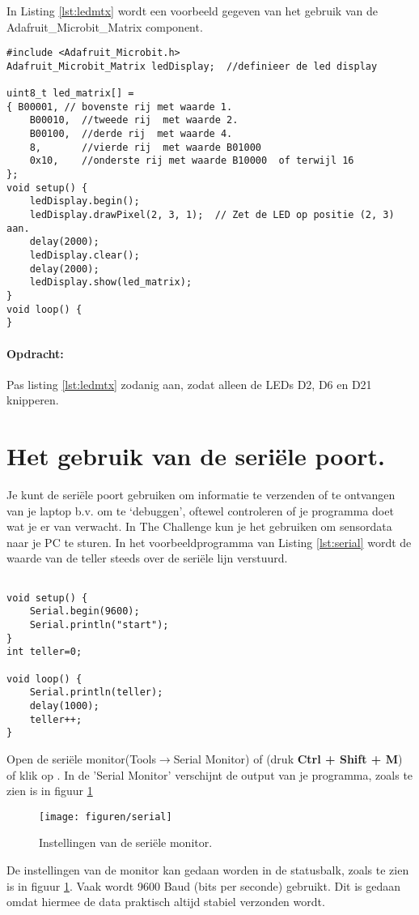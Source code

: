 In Listing \ref{lst:ledmtx} wordt een voorbeeld gegeven van het gebruik van de Adafruit\_Microbit\_Matrix component.

\begin{lstlisting}[caption= Een LED matrix demo,label={lst:ledmtx},firstnumber=1]		
#include <Adafruit_Microbit.h>
Adafruit_Microbit_Matrix ledDisplay;  //definieer de led display

uint8_t led_matrix[] =
{ B00001, // bovenste rij met waarde 1.
	B00010,  //tweede rij  met waarde 2.
	B00100,  //derde rij  met waarde 4.
	8,       //vierde rij  met waarde B01000
	0x10,    //onderste rij met waarde B10000  of terwijl 16
};
void setup() {
	ledDisplay.begin(); 
	ledDisplay.drawPixel(2, 3, 1);  // Zet de LED op positie (2, 3) aan.
	delay(2000);  
	ledDisplay.clear();  
	delay(2000);  
	ledDisplay.show(led_matrix);
}
void loop() {
}
\end{lstlisting}

\paragraph{Opdracht: }Pas listing \ref{lst:ledmtx} zodanig aan, zodat alleen de LEDs D2, D6 en D21 knipperen.\label{blz:opdrmLEDSmatrix}


\section{Het gebruik van de seriële poort.}

Je kunt de seriële poort gebruiken om informatie te verzenden of te ontvangen van je laptop b.v. om te ‘debuggen’, oftewel controleren of je programma doet wat je er van verwacht. In The Challenge kun je het gebruiken om sensordata naar je PC te sturen. In het voorbeeldprogramma van Listing \ref{lst:serial} wordt de waarde van de teller steeds over de seriële lijn verstuurd.

\begin{lstlisting}[caption= Een LED matrix demo,label={lst:serial},firstnumber=1]		
	
void setup() {
	Serial.begin(9600);
	Serial.println("start");
}
int teller=0;

void loop() {
	Serial.println(teller);
	delay(1000);
	teller++;
}
\end{lstlisting}


Open de seriële monitor(Tools$\rightarrow$Serial Monitor) of (druk \colorbox{mygray}{\textbf{Ctrl + Shift + M}}) of klik op . In de 'Serial Monitor' verschijnt de output van je programma, zoals te zien is in figuur \ref{fig:arser}
\begin{figure}[H]
	\captionsetup{justification=centering}
	\texttt{[image: figuren/serial]}
	\centering
	\caption{Instellingen van de seriële monitor.}
	\label{fig:arser}
\end{figure}
De instellingen van de monitor kan gedaan worden in de statusbalk, zoals te zien is in figuur \ref{fig:arser}.
Vaak wordt 9600 Baud (bits per seconde) gebruikt. Dit is gedaan omdat hiermee de data praktisch altijd stabiel verzonden wordt.

